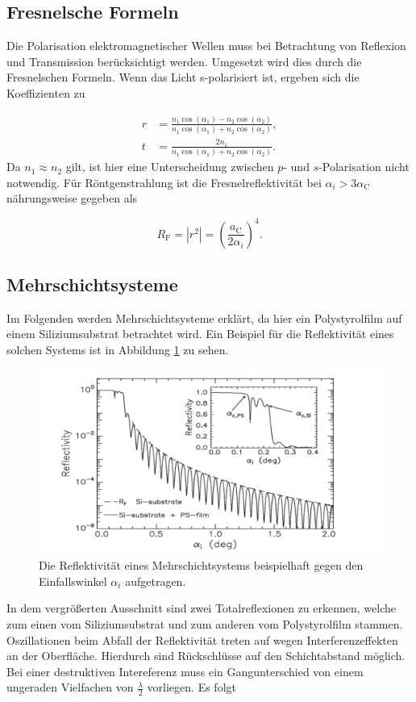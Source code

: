 \documentclass[
  bibliography=totoc,     %
  captions=tableheading,  %
  titlepage=firstiscover, %
]{scrartcl}
\begin{document}
\subsection{Fresnelsche Formeln}

Die Polarisation elektromagnetischer Wellen muss bei Betrachtung von Reflexion und Transmission berücksichtigt werden. Umgesetzt
wird dies durch die Fresnelschen Formeln. Wenn das Licht s-polarisiert ist, ergeben sich die Koeffizienten zu 

\begin{align*}
    r &= \frac{n_1 \cos{\left(\alpha_1\right)}-n_2 \cos{\left(\alpha_2\right)}}{n_1 \cos{\left(\alpha_1\right)}+n_2 \cos{\left(\alpha_2\right)}},\\
    t &= \frac{2n_1}{n_1 \cos{\left(\alpha_1\right)}+n_2 \cos{\left(\alpha_2\right)}}.
\end{align*}
Da $n_1 \approx n_2$ gilt, ist hier eine Unterscheidung zwischen $p$- und $s$-Polarisation nicht notwendig.
Für Röntgenstrahlung ist die Fresnelreflektivität bei $\alpha_i > 3\alpha_\text{C}$ nährungsweise gegeben als

\begin{equation*}
    R_\text{F} = |r^2| = \left(\frac{a_\text{C}}{2\alpha_i}\right)^4.
\end{equation*}

\subsection{Mehrschichtsysteme}
Im Folgenden werden Mehrschichtsysteme erklärt, da hier ein Polystyrolfilm auf einem Siliziumsubstrat betrachtet wird.
Ein Beispiel für die Reflektivität eines solchen Systems ist in Abbildung \ref{fig:mss} zu sehen. 

\begin{figure}
  \centering
  \includegraphics[scale=0.45]{images/Evtl.png}
  \caption{Die Reflektivität eines Mehrschichtsystems beispielhaft gegen den Einfallswinkel $\alpha_i$ aufgetragen.\cite{Tolan}}
  \label{fig:mss}
\end{figure}
\noindent
In dem vergrößerten Ausschnitt sind zwei Totalreflexionen zu erkennen, welche zum einen vom Siliziumsubstrat und zum anderen
vom Polystyrolfilm stammen. Oszillationen beim Abfall der Reflektivität treten auf wegen Interferenzeffekten an der Oberfläche.
Hierdurch sind Rückschlüsse auf den Schichtabstand möglich. Bei einer destruktiven Intereferenz muss ein Gangunterschied von 
einem ungeraden Vielfachen von $\frac{\lambda}{2}$ vorliegen. Es folgt
\end{document}
